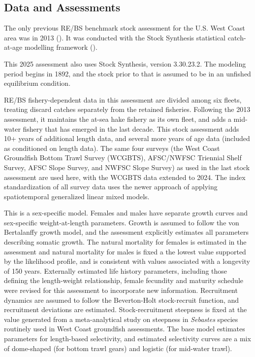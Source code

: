 \documentclass[
  english,
]{article}
\begin{document}
\subsection*{Data and Assessments}\label{data-and-assessments}

The only previous RE/BS benchmark stock assessment for the U.S. West
Coast area was in 2013 (). It was conducted with the Stock Synthesis statistical
catch-at-age modelling framework ().

This 2025 assessment also uses Stock Synthesis, version 3.30.23.2. The
modeling period begins in 1892, and the stock prior to that is assumed
to be in an unfished equilibrium condition.

RE/BS fishery-dependent data in this assessment are divided among six
fleets, treating discard catches separately from the retained fisheries.
Following the 2013 assessment, it maintains the at-sea hake fishery as
its own fleet, and adds a mid-water fishery that has emerged in the last
decade. This stock assessment adds 10+ years of additional length data,
and several more years of age data (included as conditioned on length
data). The same four surveys (the West Coast Groundfish Bottom Trawl
Survey (WCGBTS), AFSC/NWFSC Triennial Shelf Survey, AFSC Slope Survey,
and NWFSC Slope Survey) as used in the last stock assessment are used
here, with the WCGBTS data extended to 2024. The index standardization
of all survey data uses the newer approach of applying spatiotemporal
generalized linear mixed models.

This is a sex-specific model. Females and males have separate growth
curves and sex-specific weight-at-length parameters. Growth is assumed
to follow the von Bertalanffy growth model, and the assessment
explicitly estimates all parameters describing somatic growth. The
natural mortality for females is estimated in the assessment and natural
mortality for males is fixed a the lowest value supported by the
likelihood profile, and is consistent with values associated with a
longevity of 150 years. Externally estimated life history parameters,
including those defining the length-weight relationship, female
fecundity and maturity schedule were revised for this assessment to
incorporate new information. Recruitment dynamics are assumed to follow
the Beverton-Holt stock-recruit function, and recruitment deviations are
estimated. Stock-recruitment steepness is fixed at the value generated
from a meta-analytical study on steepness in \emph{Sebastes} species
routinely used in West Coast groundfish assessments. The base model
estimates parameters for length-based selectivity, and estimated
selectivity curves are a mix of dome-shaped (for bottom trawl gears) and
logistic (for mid-water trawl).
\end{document}
